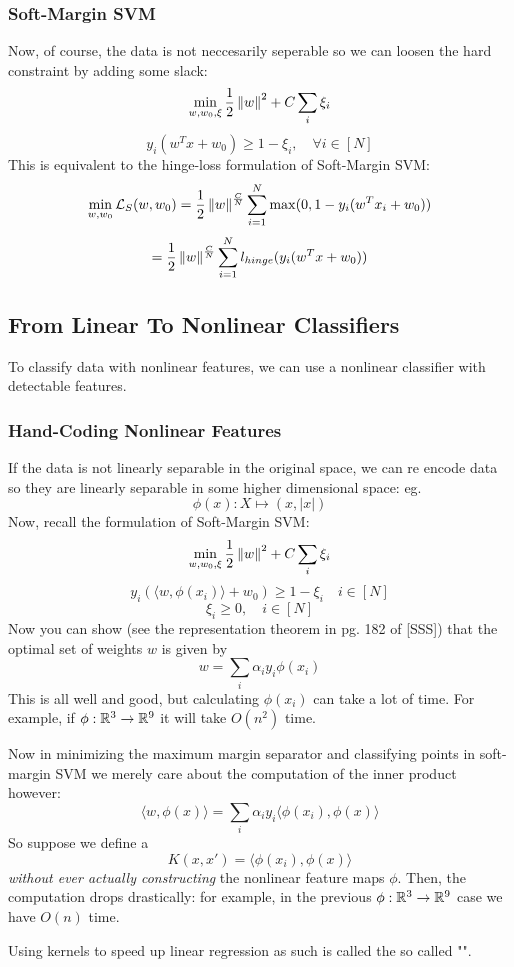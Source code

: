 \documentclass[11pt]{scrartcl}
\begin{document}
\subsubsection{Soft-Margin SVM}
Now, of course, the data is not neccesarily seperable so we can loosen the hard constraint by adding some slack: $$\min_{w,w_0,\xi}\frac{1}{2}\left\lVert w\right\rVert^2+C\sum_{i}\xi_i$$
$$y_i(w^{T}x+w_0) \ge 1-\xi_i, \quad \forall{i} \in [N]$$
This is equivalent to the hinge-loss formulation of Soft-Margin SVM:
$$\min_{w,w_0}\mathcal{L}_S(w,w_0)=\frac{1}{2}\left\lVert w\right\rVert^\frac{C}{N}\sum_{i=1}^{N}\max(0,1-y_i(w^{T}x_i+w_0))$$
$$=\frac{1}{2}\left\lVert w\right\rVert^\frac{C}{N}\sum_{i=1}^{N}l_{hinge}(y_i(w^{T}x+w_0))$$

\subsection{From Linear To Nonlinear Classifiers}
To classify data with nonlinear features, we can use a nonlinear classifier with detectable features. 

\subsubsection{Hand-Coding Nonlinear Features}
If the data is not linearly separable in the original space, we can re encode data so they are linearly separable in some higher dimensional space: eg. 
$$\phi(x): X \mapsto (x, |x|)$$
Now, recall the formulation of Soft-Margin SVM: $$\min_{w,w_0,\xi} \frac{1}{2}\left\lVert w\right\rVert^2+C\sum_{i}\xi_{i}$$
$$y_i(\langle w, \phi(x_i) \rangle +w_0) \ge 1- \xi_i \quad i \in [N]$$
$$\xi_i \ge 0, \quad i \in [N]$$
Now you can show (see the representation theorem in pg. 182 of [SSS]) that the optimal set of weights $w$ is given by $$w=\sum_{i}\alpha_iy_i\phi(x_i)$$
This is all well and good, but calculating $\phi(x_i)$ can take a lot of time. For example, if $\phi:\mathbb{R}^3 \to \mathbb{R}^9$ it will take $O(n^2)$ time.

Now in minimizing the maximum margin separator and classifying points in soft-margin SVM we merely care about the computation of the inner product however:
$$\langle w,\phi(x) \rangle = \sum_{i}\alpha_iy_i\langle \phi(x_i),\phi(x) \rangle$$
So suppose we define a  $$K(x,x')=\langle \phi(x_i),\phi(x) \rangle$$ \textit{without ever actually constructing} the nonlinear feature maps $\phi$. Then, the computation drops drastically: for example, in the previous $\phi:\mathbb{R}^3 \to \mathbb{R}^9$ case we have $O(n)$ time. 

Using kernels to speed up linear regression as such is called the so called "". 
\newpage
\end{document}
